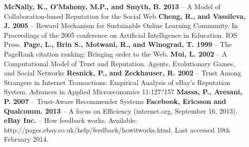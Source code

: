 \documentclass[]{final_report}
\begin{document}




\newpage
\begin{thebibliography}{99}
\raggedright
\textbf{McNally, K., O'Mahony, M.P., and Smyth, B. 2013} -- A Model of Collaboration-based Reputation for the Social Web
\linebreak
\linebreak
\textbf{Cheng, R., and Vassileva, J. 2005} -- Reward Mechanism for Sustainable Online Learning Community. In Proceedings of the 2005 conference on Artificial Intelligence in Education. IOS Press.
\linebreak
\linebreak
\textbf{Page, L., Brin S., Motwani, R., and Winograd, T. 1999} -- The PageRank citation ranking: Bringing order to the Web.
\linebreak
\linebreak
\textbf{Mui, L. 2002} -- A Computational Model of Trust and Reputation. Agents, Evolutionary Games, and Social Networks
\linebreak
\linebreak
\textbf{Resnick, P., and Zeckhauser, R. 2002} -- Trust Among Strangers in Internet Transactions: Empirical Analysis of eBay's Reputation System. Advances in Applied Microeconomics 11:127?157
\linebreak
\linebreak
\textbf{Massa, P., Avesani, P. 2007} -- Trust-Aware Recommender Systems
\linebreak
\linebreak
\textbf{Facebook, Ericsson and Qualcomm. 2013} -- A focus on Efficiency (internet.org, September 16, 2013).
\linebreak
\linebreak
\textbf{eBay Inc.} -- How feedback works. Available: http://pages.ebay.co.uk/help/feedback/howitworks.html. Last accessed 10th February 2014.


\end{thebibliography}
\label{endpage}
\end{document}
